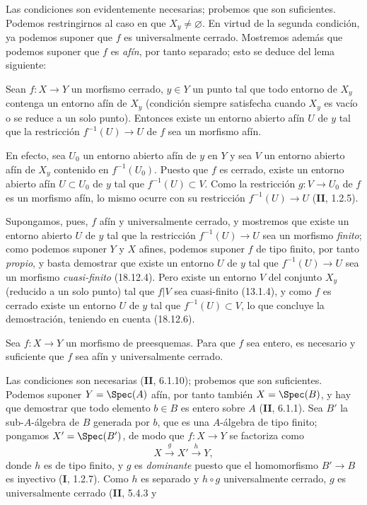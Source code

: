 Las condiciones son evidentemente necesarias; probemos que son suficientes. Podemos restringirnos al caso en que $X_y\neq\varnothing$. En virtud de la segunda condición, ya podemos suponer que $f$ es universalmente cerrado. Mostremos además que podemos suponer que $f$ es \emph{afín}, por tanto separado; esto se deduce del lema siguiente:

\begin{lemma}[18.12.7.1]
\label{IV.18.12.7.1}
Sean $f:X\to Y$ un morfismo cerrado, $y\in Y$ un punto tal que todo entorno de $X_y$ contenga un entorno afín de $X_y$ (condición siempre satisfecha cuando $X_y$ es vacío o se reduce a un solo punto). Entonces existe un entorno abierto afín $U$ de $y$ tal que la restricción $f^{-1}(U)\to U$ de $f$ sea un morfismo afín.
\end{lemma}

En efecto, sea $U_0$ un entorno abierto afín de $y$ en $Y$ y sea $V$ un entorno abierto afín de $X_y$ contenido en $f^{-1}(U_0)$. Puesto que $f$ es cerrado, existe un entorno abierto afín $U\subset U_0$ de $y$ tal que $f^{-1}(U)\subset V$. Como la restricción $g:V\to U_0$ de $f$ es un morfismo afín, lo mismo ocurre con su restricción $f^{-1}(U)\to U$ (\textbf{II}, 1.2.5).

Supongamos, pues, $f$ afín y universalmente cerrado, y mostremos que existe un entorno abierto $U$ de $y$ tal que la restricción $f^{-1}(U)\to U$ sea un morfismo \emph{finito}; como podemos suponer $Y$ y $X$ afines, podemos suponer $f$ de tipo finito, por tanto \emph{propio}, y basta demostrar que existe un entorno $U$ de $y$ tal que $f^{-1}(U)\to U$ sea un morfismo \emph{cuasi-finito} (18.12.4). Pero existe un entorno $V$ del conjunto $X_y$ (reducido a un solo punto) tal que $f|V$ sea cuasi-finito (13.1.4), y como $f$ es cerrado existe un entorno $U$ de $y$ tal que $f^{-1}(U)\subset V$, lo que concluye la demostración, teniendo en cuenta (18.12.6).

\begin{proposition}[18.12.8]
\label{IV.18.12.8}
Sea $f:X\to Y$ un morfismo de preesquemas. Para que $f$ sea entero, es necesario y suficiente que $f$ sea afín y universalmente cerrado.
\end{proposition}

Las condiciones son necesarias (\textbf{II}, 6.1.10); probemos que son suficientes. Podemos suponer $Y=\Spec(A)$ afín, por tanto también $X=\Spec(B)$, y hay que demostrar que todo elemento $b\in B$ es entero sobre $A$ (\textbf{II}, 6.1.1). Sea $B'$ la sub-$A$-álgebra de $B$ generada por $b$, que es una $A$-álgebra de tipo finito; pongamos $X'=\Spec(B')$, de modo que $f:X\to Y$ se factoriza como
\[
  X\xrightarrow{g}X'\xrightarrow{h}Y,
\]
donde $h$ es de tipo finito, y $g$ es \emph{dominante} puesto que el homomorfismo $B'\to B$ es inyectivo (\textbf I, 1.2.7). Como $h$ es separado y $h\circ g$ universalmente cerrado, $g$ es universalmente cerrado (\textbf{II}, 5.4.3 y

